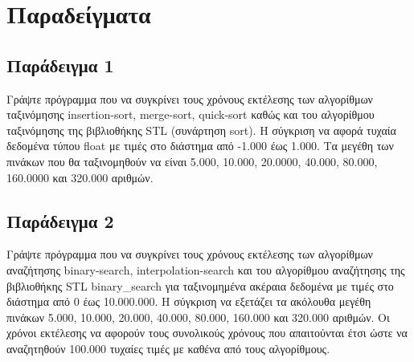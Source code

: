 





\section{Παραδείγματα}
\subsection{Παράδειγμα 1}
Γράψτε πρόγραμμα που να συγκρίνει τους χρόνους εκτέλεσης των αλγορίθμων ταξινόμησης insertion-sort, merge-sort, quick-sort καθώς και του αλγορίθμου ταξινόμησης της βιβλιοθήκης STL (συνάρτηση sort). Η σύγκριση να αφορά τυχαία δεδομένα τύπου float με τιμές στο διάστημα από -1.000 έως 1.000. Τα μεγέθη των πινάκων που θα ταξινομηθούν να είναι 5.000, 10.000, 20.0000, 40.000, 80.000, 160.0000 και 320.000 αριθμών. 






\subsection{Παράδειγμα 2}
Γράψτε πρόγραμμα που να συγκρίνει τους χρόνους εκτέλεσης των αλγορίθμων αναζήτησης binary-search, interpolation-search και του αλγορίθμου αναζήτησης της βιβλιοθήκης STL binary\_search για ταξινομημένα ακέραια δεδομένα με τιμές στο διάστημα από 0  έως 10.000.000. Η σύγκριση να εξετάζει τα ακόλουθα μεγέθη πινάκων 5.000, 10.000, 20.000, 40.000, 80.000, 160.000 και 320.000 αριθμών. Οι χρόνοι εκτέλεσης να αφορούν τους συνολικούς χρόνους που απαιτούνται έτσι ώστε να αναζητηθούν 100.000 τυχαίες τιμές με καθένα από τους αλγορίθμους. 






